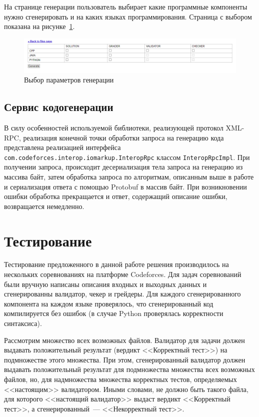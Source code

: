 \documentclass[times,specification,annotation]{style/itmo-student-thesis/itmo-student-thesis}
\begin{document}
На странице генерации пользователь выбирает какие программные компоненты нужно сгенерировать и на каких языках программирования. Страница с выбором показана на рисунке~\ref{generate-screenshot}.

\begin{figure}[!h]
\caption{Выбор параметров генерации}\label{generate-screenshot}
\centering
\includegraphics[scale=0.6]{img/generate.png}
\end{figure}

\subsection{Сервис кодогенерации}

В силу особенностей используемой библиотеки, реализующей протокол XML-RPC, реализация конечной точки обработки запроса на генерацию кода представлена реализацией интерфейса \texttt{com.codeforces.interop.iomarkup.InteropRpc} классом \texttt{InteropRpcImpl}. При получении запроса, происходит десериализация тела запроса на генерацию из массива байт, затем обработка запроса по алгоритмам, описанным выше в работе и сериализация ответа с помощью Protobuf в массив байт. При возникновении ошибки обработка прекращается и ответ, содержащий описание ошибки, возвращается немедленно.

\section{Тестирование}

Тестирование предложенного в данной работе решения производилось на нескольких соревнованиях на платформе Codeforces. Для задач соревнований были вручную написаны описания входных и выходных данных и сгенерированны валидатор, чекер и грейдеры. Для каждого сгенерированного компонента на каждом языке проверялось, что сгенерированный код компилируется без ошибок (в случае Python проверялась корректности синтаксиса).

Рассмотрим множество всех возможных файлов. Валидатор для задачи должен выдавать положительный результат (вердикт <<Корректный тест>>) на подмножестве этого множества. При этом, сгенерированный валидатор должен выдавать положительный результат для подмножества множества всех возможных файлов, но, для надмножества множества корректных тестов, определяемых <<настоящим>> валидатором. Иными словами, не должно быть такого файла, для которого <<настоящий валидатор>> выдаст вердикт <<Корректный тест>>, а сгенерированный~--- <<Некорректный тест>>.
\end{document}

